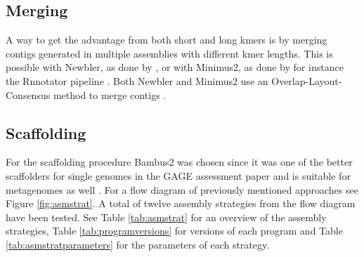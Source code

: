 \documentclass[a4paper,12pt]{report}
\begin{document}
\subsection{Merging}
A way to get the advantage from both short and long kmers is by merging contigs
generated in multiple assemblies with different kmer lengths. This is possible
with Newbler, as done by \citet{Luo22347999}, or with Minimus2, as done by for
instance the Rnnotator pipeline \cite{Martin21106091}. Both Newbler and
Minimus2 use an Overlap-Layout-Consensus method to merge contigs
\cite{Sommer17324286,Miller20211242}.


\subsection{Scaffolding}
For the scaffolding procedure Bambus2 was chosen since it was one of the better
scaffolders for single genomes in the GAGE assessment paper
\cite{Salzberg22147368} and is suitable for metagenomes as well
\cite{Koren21926123}. For a flow diagram of previously mentioned approaches see
Figure \ref{fig:asmstrat}. A total of twelve assembly strategies from the flow
diagram have been tested. See Table \ref{tab:asmstrat} for an overview of the
assembly strategies, Table \ref{tab:programversions} for versions of each
program and Table \ref{tab:asmstratparameters} for the parameters of each
strategy.
\end{document}
